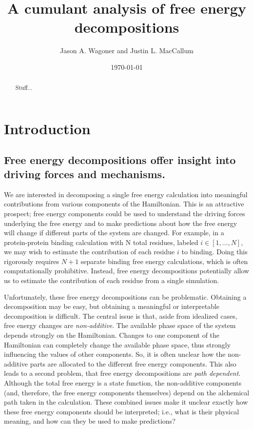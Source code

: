 \documentclass{article}
\begin{document}
\title{A cumulant analysis of free energy decompositions}
\author{Jason A. Wagoner and Justin L. MacCallum}

\date{ \today}

\maketitle

\begin{abstract}
Stuff...
\end{abstract}


\section{Introduction}

\subsection{Free energy decompositions offer insight into driving forces and mechanisms.}

We are interested in decomposing a single free energy calculation into meaningful contributions from various components of the Hamiltonian. 
This is an attractive prospect; free energy components could be used to understand the driving forces underlying the free energy and to make predictions about how the free energy will change if different parts of the system are changed. For example, in a protein-protein binding calculation with N total residues, labeled $i \in \left[1, \ldots,N\right]$, we may wish to estimate the contribution of each residue $i$ to binding. Doing this rigorously requires $N+1$ separate binding free energy calculations, which is often computationally prohibitive. Instead, free energy decompositions potentially allow us to estimate the contribution of each residue from a single simulation.

Unfortunately, these free energy decompositions can be problematic. Obtaining a decomposition may be easy, but obtaining a meaningful or interpretable decomposition is difficult. The central issue is that, aside from idealized cases, free energy changes are \textit{non-additive}. The available phase space of the system depends strongly on the Hamiltonian. Changes to one component of the Hamiltonian can completely change the available phase space, thus strongly influencing the values of other components. So, it is often unclear how the non-additive parts are allocated to the different free energy components. This also leads to a second problem, that free energy decompositions are \textit{path dependent}. Although the total free energy is a state function, the non-additive components (and, therefore, the free energy components themselves) depend on the alchemical path taken in the calculation. These combined issues make it unclear exactly how these free energy components should be interpreted; i.e., what is their physical meaning, and how can they be used to make predictions? 
\end{document}

